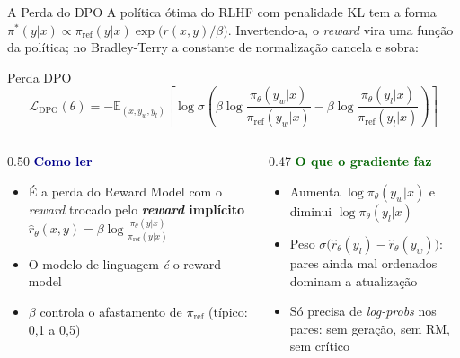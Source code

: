 \documentclass[aspectratio=169, xcolor=dvipsnames]{beamer}
\begin{document}
  \begin{frame}{A Perda do DPO \cite{rafailov2023dpo}}
    \small
    A política ótima do RLHF com penalidade KL tem a forma $\pi^*(y|x) \propto \pi_{\text{ref}}(y|x)\exp\!\big(r(x,y)/\beta\big)$.
    Invertendo-a, o \textit{reward} vira uma função da política; no Bradley-Terry a constante de normalização cancela e sobra:
    \begin{block}{Perda DPO}
      \vspace{-0.4em}
      \[
        \mathcal{L}_{\text{DPO}}(\theta) = -\mathbb{E}_{(x,y_w,y_l)}\!\left[\log\sigma\!\left(
          \beta\log\frac{\pi_\theta(y_w|x)}{\pi_{\text{ref}}(y_w|x)}
          - \beta\log\frac{\pi_\theta(y_l|x)}{\pi_{\text{ref}}(y_l|x)}
        \right)\right]
      \]
      \vspace{-0.6em}
    \end{block}
    \begin{columns}[T]
      \begin{column}{0.50\textwidth}
        \textcolor{DarkBlue}{\textbf{Como ler}}
        \begin{itemize}
          \item É a perda do Reward Model com o \textit{reward} trocado pelo \textbf{\textit{reward} implícito} $\hat r_\theta(x,y) = \beta\log\frac{\pi_\theta(y|x)}{\pi_{\text{ref}}(y|x)}$
          \item O modelo de linguagem \emph{é} o reward model
          \item $\beta$ controla o afastamento de $\pi_{\text{ref}}$ (típico: 0,1 a 0,5)
        \end{itemize}
      \end{column}
      \begin{column}{0.47\textwidth}
        \textcolor{DarkGreen}{\textbf{O que o gradiente faz}}
        \begin{itemize}
          \item Aumenta $\log\pi_\theta(y_w|x)$ e diminui $\log\pi_\theta(y_l|x)$
          \item Peso $\sigma\big(\hat r_\theta(y_l) - \hat r_\theta(y_w)\big)$: pares ainda mal ordenados dominam a atualização
          \item Só precisa de \textit{log-probs} nos pares: sem geração, sem RM, sem crítico
        \end{itemize}
      \end{column}
    \end{columns}
\end{frame}
\end{document}
